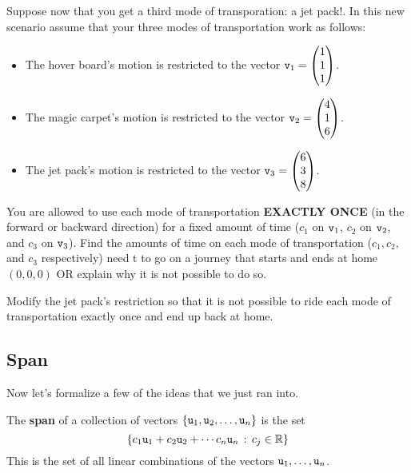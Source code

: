 \begin{problem}
    Suppose now that you get a third mode of transporation: a jet pack!.  In this new
    scenario assume that your three modes of transportation work as follows:
    \begin{itemize}
        \item The hover board's motion is restricted to the vector $\texttt{v}_1 =
            \begin{pmatrix} 1\\1\\1\end{pmatrix}$.
        \item The magic carpet's motion is restricted to the vector $\texttt{v}_2 =
            \begin{pmatrix} 4\\1\\6\end{pmatrix}$.
        \item The jet pack's motion is restricted to the vector $\texttt{v}_3 =
            \begin{pmatrix} 6\\3\\8\end{pmatrix}$.
    \end{itemize}
    You are allowed to use each mode of transportation {\bf EXACTLY ONCE} (in the forward or
    backward direction) for a fixed amount of time ($c_1$ on $\texttt{v}_1$, $c_2$ on $\texttt{v}_2$,
    and $c_3$ on $\texttt{v}_3$).  Find the amounts of time on each mode of transportation ($c_1,
    c_2,$ and $c_3$ respectively) need t to go on a journey that starts and ends at home
    $(0,0,0)$ OR explain why it is not possible to do so.
\end{problem}

\begin{problem}
    Modify the jet pack's restriction so that it is not possible to ride each mode of
    transportation exactly once and end up back at home.
\end{problem}



\subsection{Span}
Now let's formalize a few of the ideas that we just ran into.
\begin{definition}
    The {\bf span} of a collection of vectors $\{\texttt{u}_1,\texttt{u}_2,\ldots,\texttt{u}_n\}$ is the set \[
    \{ c_1 \texttt{u}_1 + c_2 \texttt{u}_2 + \cdots c_n \texttt{u}_n \, : \, c_j \in \mathbb{R} \} \] This is
    the set of all linear combinations of the vectors $\texttt{u}_1, \ldots, \texttt{u}_n$.
\end{definition}

